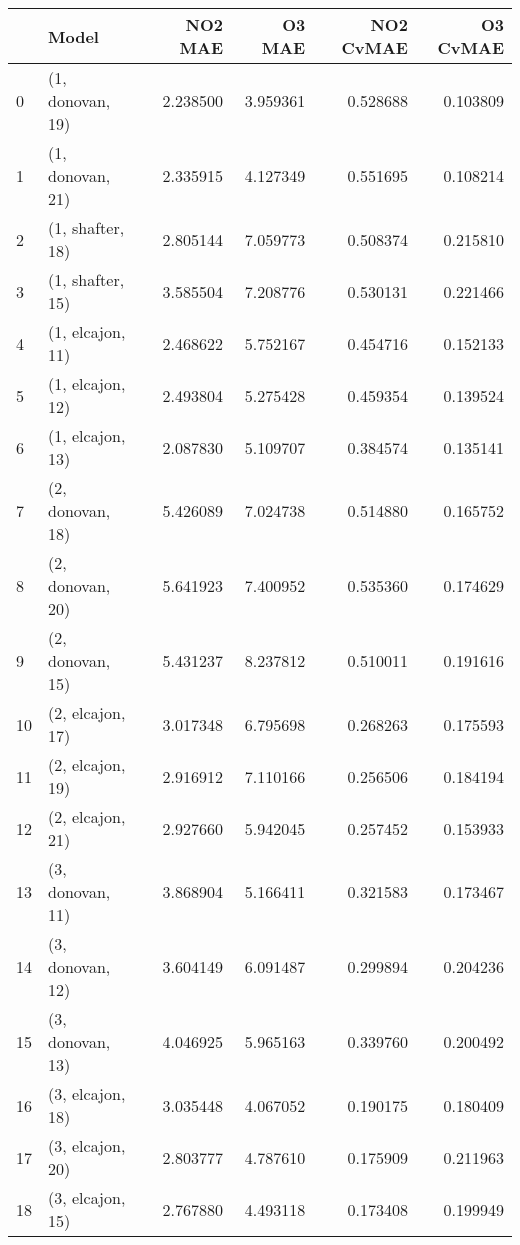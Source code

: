 \begin{tabular}{llrrrr}
\toprule
{} &             Model &   NO2 MAE &    O3 MAE &  NO2 CvMAE &  O3 CvMAE \\
\midrule
0  &  (1, donovan, 19) &  2.238500 &  3.959361 &   0.528688 &  0.103809 \\
1  &  (1, donovan, 21) &  2.335915 &  4.127349 &   0.551695 &  0.108214 \\
2  &  (1, shafter, 18) &  2.805144 &  7.059773 &   0.508374 &  0.215810 \\
3  &  (1, shafter, 15) &  3.585504 &  7.208776 &   0.530131 &  0.221466 \\
4  &  (1, elcajon, 11) &  2.468622 &  5.752167 &   0.454716 &  0.152133 \\
5  &  (1, elcajon, 12) &  2.493804 &  5.275428 &   0.459354 &  0.139524 \\
6  &  (1, elcajon, 13) &  2.087830 &  5.109707 &   0.384574 &  0.135141 \\
7  &  (2, donovan, 18) &  5.426089 &  7.024738 &   0.514880 &  0.165752 \\
8  &  (2, donovan, 20) &  5.641923 &  7.400952 &   0.535360 &  0.174629 \\
9  &  (2, donovan, 15) &  5.431237 &  8.237812 &   0.510011 &  0.191616 \\
10 &  (2, elcajon, 17) &  3.017348 &  6.795698 &   0.268263 &  0.175593 \\
11 &  (2, elcajon, 19) &  2.916912 &  7.110166 &   0.256506 &  0.184194 \\
12 &  (2, elcajon, 21) &  2.927660 &  5.942045 &   0.257452 &  0.153933 \\
13 &  (3, donovan, 11) &  3.868904 &  5.166411 &   0.321583 &  0.173467 \\
14 &  (3, donovan, 12) &  3.604149 &  6.091487 &   0.299894 &  0.204236 \\
15 &  (3, donovan, 13) &  4.046925 &  5.965163 &   0.339760 &  0.200492 \\
16 &  (3, elcajon, 18) &  3.035448 &  4.067052 &   0.190175 &  0.180409 \\
17 &  (3, elcajon, 20) &  2.803777 &  4.787610 &   0.175909 &  0.211963 \\
18 &  (3, elcajon, 15) &  2.767880 &  4.493118 &   0.173408 &  0.199949 \\
\bottomrule
\end{tabular}
